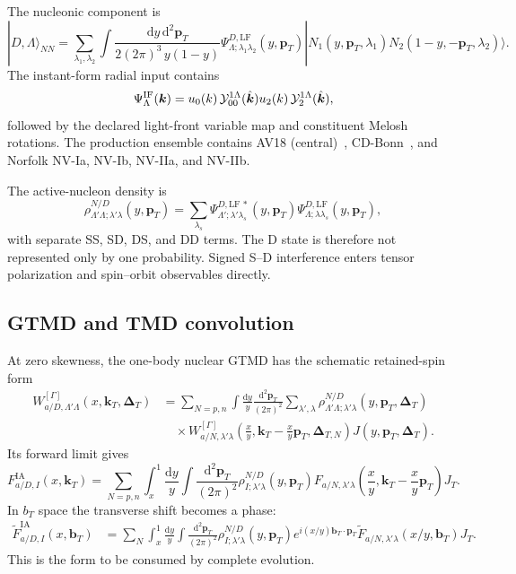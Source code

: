 \documentclass[11pt]{article}
\newcommand{\kT}{\bm{k}_{T}}
\newcommand{\pT}{\bm{p}_{T}}
\newcommand{\bT}{\bm{b}_{T}}
\newcommand{\DT}{\bm{\Delta}_{T}}
\newcommand{\dd}{\mathrm{d}}
\newcommand{\LF}{\mathrm{LF}}
\newcommand{\IA}{\mathrm{IA}}
\begin{document}
The nucleonic component is
\begin{equation}
|D,\Lambda\rangle_{NN}
=\sum_{\lambda_1,\lambda_2}
\int\frac{\dd y\,\dd^2\pT}
          {2(2\pi)^3\,y(1-y)}
\Psi_{\Lambda;\lambda_1\lambda_2}^{D,\LF}(y,\pT)
|N_1(y,\pT,\lambda_1)N_2(1-y,-\pT,\lambda_2)\rangle .
\label{eq:deuteron-lf}
\end{equation}
The instant-form radial input contains
\begin{equation}
\Psi_\Lambda^{\rm IF}(\bm k)
=u_0(k)\,\mathcal Y_{00}^{1\Lambda}(\hat{\bm k})
u_2(k)\,\mathcal Y_{2}^{1\Lambda}(\hat{\bm k}),
\label{eq:sd-wave}
\end{equation}
followed by the declared light-front variable map and constituent Melosh
rotations.  The production ensemble contains AV18 (central)~\cite{AV18},
CD-Bonn~\cite{CDBonn}, and
Norfolk NV-Ia, NV-Ib, NV-IIa, and NV-IIb.

The active-nucleon density is
\begin{equation}
\rho_{\Lambda'\Lambda;\lambda'\lambda}^{N/D}(y,\pT)
=\sum_{\lambda_s}
\Psi_{\Lambda';\lambda'\lambda_s}^{D,\LF\,\ast}(y,\pT)
\Psi_{\Lambda;\lambda\lambda_s}^{D,\LF}(y,\pT),
\label{eq:spectral-density}
\end{equation}
with separate SS, SD, DS, and DD terms.  The D state is therefore not
represented only by one probability.  Signed S--D interference enters
tensor polarization and spin--orbit observables directly.

\subsection{GTMD and TMD convolution}

At zero skewness, the one-body nuclear GTMD has the schematic retained-spin
form
\begin{align}
W_{a/D,\Lambda'\Lambda}^{[\Gamma]}(x,\kT,\DT)
&=\sum_{N=p,n}
\int\frac{\dd y}{y}\frac{\dd^2\pT}{(2\pi)^2}
\sum_{\lambda',\lambda}
\rho_{\Lambda'\Lambda;\lambda'\lambda}^{N/D}
    (y,\pT,\DT)
\nonumber\\[-1mm]
&\quad\times
W_{a/N,\lambda'\lambda}^{[\Gamma]}
\left(\frac{x}{y},
\kT-\frac{x}{y}\pT,\bm{\Delta}_{T,N}\right)
J(y,\pT,\DT).
\label{eq:gtmd-convolution}
\end{align}
Its forward limit gives
\begin{equation}
F_{a/D,I}^{\IA}(x,\kT)
=\sum_{N=p,n}\int_x^1\frac{\dd y}{y}
\int\frac{\dd^2\pT}{(2\pi)^2}
\rho_{I;\lambda'\lambda}^{N/D}(y,\pT)
F_{a/N,\lambda'\lambda}
\left(\frac{x}{y},\kT-\frac{x}{y}\pT\right)J_T.
\label{eq:tmd-convolution}
\end{equation}
In \(b_T\) space the transverse shift becomes a phase:
\begin{align}
\widetilde F_{a/D,I}^{\IA}(x,\bT)
&=\sum_N\int_x^1\frac{\dd y}{y}
\int\frac{\dd^2\pT}{(2\pi)^2}
\rho_{I;\lambda'\lambda}^{N/D}(y,\pT)
e^{i(x/y)\bT\cdot\pT}
\widetilde F_{a/N,\lambda'\lambda}(x/y,\bT)J_T.
\label{eq:bspace-convolution}
\end{align}
This is the form to be consumed by complete evolution.
\end{document}
